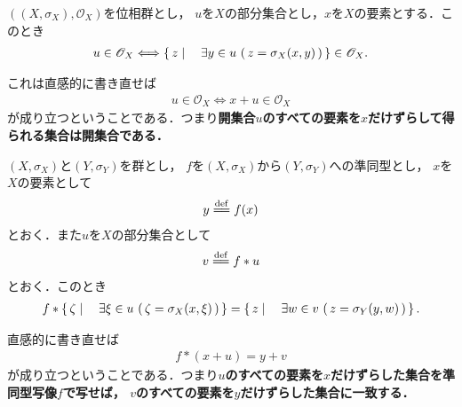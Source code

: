 	\begin{screen}
		\begin{thm}[位相群の開集合はずらしても開]\label{thm:topological_groups_are_invariant}
			$\left(\left(X,\sigma_X\right),\mathscr{O}_X\right)$を位相群とし，
			$u$を$X$の部分集合とし，$x$を$X$の要素とする．このとき
			\begin{align}
				u \in \mathscr{O}_X \Longleftrightarrow 
				\left\{\, z \mid \quad \exists y \in u\, \left(\, z = \sigma_X(x,y)\, \right)\, \right\} \in \mathscr{O}_X.
			\end{align}
		\end{thm}
	\end{screen}
	
	これは直感的に書き直せば
	\begin{align}
		u \in \mathscr{O}_X \Longleftrightarrow x + u \in \mathscr{O}_X
	\end{align}
	が成り立つということである．つまり{\bf 開集合$u$のすべての要素を$x$だけずらして得られる集合は開集合である．}
	
	\begin{sketch}
	\end{sketch}
	
	\begin{screen}
		\begin{dfn}[不変位相]
		\end{dfn}
	\end{screen}
	
	\begin{screen}
		\begin{thm}[準同型写像は平行移動を保存する]
		\label{thm:homomorphism_preserves_translation}
			$\left(X,\sigma_X\right)$と$\left(Y,\sigma_Y\right)$を群とし，
			$f$を$\left(X,\sigma_X\right)$から$\left(Y,\sigma_Y\right)$への準同型とし，
			$x$を$X$の要素として
			\begin{align}
				y \defeq f(x)
			\end{align}
			とおく．また$u$を$X$の部分集合として
			\begin{align}
				v \defeq f \ast u
			\end{align}
			とおく．このとき
			\begin{align}
				f \ast \left\{\, \zeta \mid \quad \exists \xi \in u\, \left(\, \zeta = \sigma_X(x,\xi)\, \right)\, \right\}
				= \left\{\, z \mid \quad \exists w \in v\, \left(\, z = \sigma_Y(y,w)\, \right)\, \right\}.
			\end{align}
		\end{thm}
	\end{screen}
	
	直感的に書き直せば
	\begin{align}
		f \ast (x + u) = y + v
	\end{align}
	が成り立つということである．つまり{\bf $u$のすべての要素を$x$だけずらした集合を準同型写像$f$で写せば，
	$v$のすべての要素を$y$だけずらした集合に一致する．}
	
